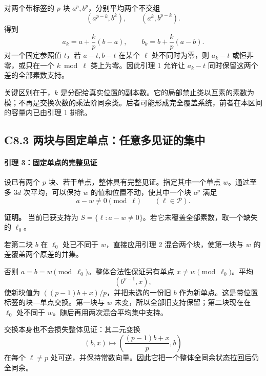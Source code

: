 \documentclass[11pt,a4paper]{article}
\theoremstyle{definition}
\numberwithin{equation}{section}
\begin{document}
{对两个带标签的} \(p\) {块} \(a^p,b^p\){，分别平均两个不交组} \[
(a^{p-k},b^k),\qquad(a^k,b^{p-k}).
\] {得到} \[
a_k=a+\frac{k}{p}(b-a),\qquad
b_k=b+\frac{k}{p}(a-b).
\tag{C8.5}
\] {对一个固定参照值} \(t\){，若} \(a-t,b-t\) {在某个} \(\ell\) {处不同时为零，则} \(a_k-t\) {或恒非零，或只在一个} \(k\bmod\ell\) {类上为零。因此引理} {1} {允许让} \(a_k-t\) {同时保留这两个差的全部素数支持。}

{关键区别在于，}\(k\) {是分配给真实位置的副本数。它的局部禁止类以互素的素数为模；不再是交换次数的乘法阶同余类。后者可能形成完全覆盖系统，前者在本区间的容量内已由引理} {1} {排除。}

\subsection*{\texorpdfstring{{C8.3} {两块与固定单点：任意多见证的集中}}{C8.3 两块与固定单点：任意多见证的集中}}\label{C8-h49}

\paragraph*{\texorpdfstring{{引理} {3：固定单点的完整见证}}{引理 3：固定单点的完整见证}}\label{C8-h50}

{设已有两个} \(p\) {块、若干单点，整体具有完整见证。指定其中一个单点} \(w\){。通过至多} \(3d\) {次平均，可以保持} \(w\) {的值和位置不动，使其中一个块} \(a^p\) {满足} \[
a-w\ne0\pmod\ell\qquad(\ell\in\mathcal P).
\tag{C8.6}
\]

\textbf{{证明。}} {当前已获支持为} \(S=\{\ell:a-w\ne0\}\){。若它未覆盖全部素数，取一个缺失的} \(\ell_0\){。}

{若第二块} \(b\) {在} \(\ell_0\) {处已不同于} \(w\){，直接应用引理} {2} {混合两个块，使第一块与} \(w\) {的差覆盖两个原差的并集。}

{否则} \(a=b=w\pmod{\ell_0}\){。整体合法性保证另有单点} \(x\ne w\pmod{\ell_0}\){。平均} \[
(b^{p-1},x),
\] {使新块值为} \(((p-1)b+x)/p\){，并把未选的一份旧} \(b\) {作为新单点。这是带位置标签的块---单点交换。第一块与} \(w\) {未变，所以全部旧支持保留；第二块现在在} \(\ell_0\) {处不同于} \(w\){。随后再用两次混合平均集中支持。}

{交换本身也不会损失整体见证：其二元变换} \[
(b,x)\mapsto\left(\frac{(p-1)b+x}{p},b\right)
\] {在每个} \(\ell\ne p\) {处可逆，并保持常数向量。因此它把一个整体全同余状态拉回后仍全同余。}
\end{document}
